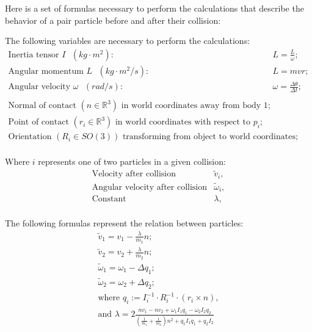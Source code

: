 \documentclass[a4paper,12pt]{report}
\begin{document}
Here is a set of formulas necessary to perform the calculations that describe
the behavior of a pair particle before and after their collision:

The following variables are necessary to perform the calculations:
\[
\begin{array}{ll}
    \text{Inertia tensor $I$ } (kg\cdot m^2): & L = \frac{L}{\omega}; \\
    \text{Angular momentum $L$ } (kg\cdot m^2/s): & L = mvr; \\
    \text{Angular velocity $\omega$ } (rad/s): & \omega = \frac{\Delta \theta}{\Delta t}; \\

	\\

	\text{Normal of contact } (n \in \mathbb{R}^3) \text{ in world coordinates away from body 1}; \\
	\text{Point of contact } (r_i \in \mathbb{R}^3) \text{ in world coordinates with respect to $p_i$}; \\
	\text{Orientation } (R_i \in SO(3)) \text{ transforming from object to world coordinates}; \\
\end{array}
\]

Where $i$ represents one of two particles in a given collision:
\[
\begin{array}{ll}
	\text{Velocity after collision} & \tilde{v}_i, \\ 
	\text{Angular velocity after collision} & \tilde{\omega}_i, \\
	\text{Constant} & \lambda, \\
\end{array}
\]

The following formulas represent the relation between particles:
\[
\begin{array}{cc}
	\tilde{v}_1 = v_1 - \frac{\lambda}{m_1} n; \\ 
	\tilde{v}_2 = v_2 + \frac{\lambda}{m_2} n; \\
	\tilde{\omega}_1 = \omega_1 - \Delta q_1; \\
	\tilde{\omega}_2 = \omega_2 + \Delta q_2; \\

	\text{where } q_i := I_i^{-1} \cdot R_i^{-1} \cdot (r_i\times n), \\
	\text{and } \lambda = 2 \frac{n v_1 - n v_2 + \omega_1 I_1 q_1 - \omega_2 I_2 q_2}
	{(\frac{1}{m_1} + \frac{1}{m_2})n^2 + q_1 I_1 q_1 + q_2 I_2} \\
\end{array}
\]
\end{document}
